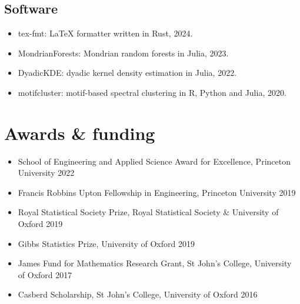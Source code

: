 \documentclass{wgu-cv}
\begin{document}
\subsection{Software}{}
\begin{itemize}

  \item tex-fmt: LaTeX formatter written in Rust, 2024. \\

  \item MondrianForests: Mondrian random forests in Julia, 2023. \\

  \item DyadicKDE: dyadic kernel density estimation in Julia, 2022. \\

  \item motifcluster: motif-based spectral clustering
    in R, Python and Julia, 2020. \\

\end{itemize}

\vspace{0.1cm}
\section{Awards \& funding}
\vspace{-0.22cm}

\begin{itemize}
  \item School of Engineering and Applied Science Award for Excellence,
    Princeton University
    \hfill 2022%
  \item Francis Robbins Upton Fellowship in Engineering,
    Princeton University
    \hfill 2019%
  \item Royal Statistical Society Prize,
    Royal Statistical Society \& University of Oxford
    \hfill 2019%
  \item Gibbs Statistics Prize,
    University of Oxford
    \hfill 2019%
  \item James Fund for Mathematics Research Grant,
    St John's College, University of Oxford
    \hfill 2017%
  \item Casberd Scholarship,
    St John's College, University of Oxford
    \hfill 2016%
\end{itemize}
\end{document}
